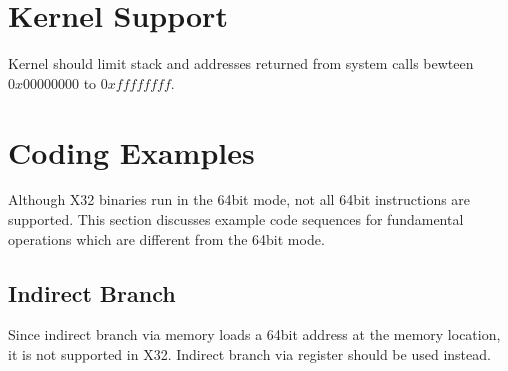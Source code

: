 \section{Kernel Support}
Kernel should limit stack and addresses returned from system calls
bewteen $0x00000000$ to $0xffffffff$.

\section{Coding Examples}

Although X32 binaries run in the 64bit mode, not all 64bit instructions
are supported. This section discusses example code sequences for
fundamental operations which are different from the 64bit mode.

\subsection{Indirect Branch}

Since indirect branch via memory loads a 64bit address at the memory
location, it is not supported in X32.  Indirect branch via register
should be used instead.

\begin{table}[H]
\Hrule
\caption{Indirect Branch}
\begin{center}
\end{center}
\Hrule
\end{table}
